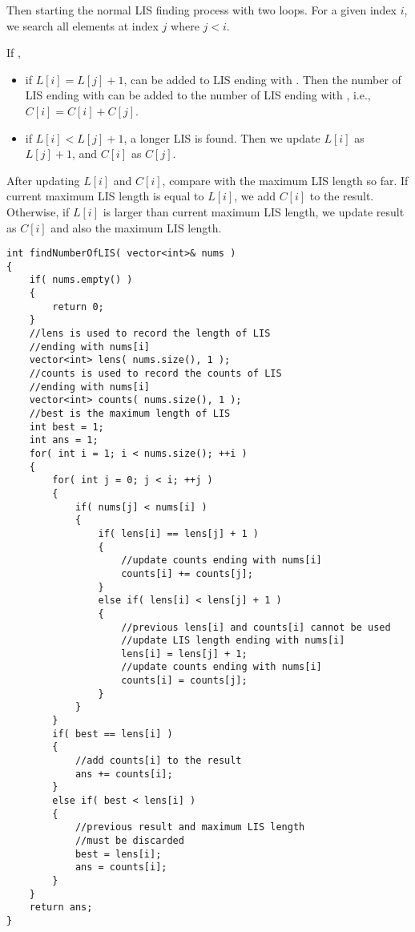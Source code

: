 Then starting the normal LIS finding process with two loops.
For a given index $i$, we search all elements at index $j$ where $j <i$. 

If , 
\begin{itemize}
\item if $L[i]=L[j]+1$,  can be added to LIS ending with . Then the number of LIS ending with  can be added to the number of LIS ending with , i.e., $C[i] = C[i] + C[j]$.
\item if $L[i] < L[j]+1$, a longer LIS is found. Then we update $L[i]$ as $L[j]+1$, and $C[i]$ as $C[j]$. 
\end{itemize}

After updating $L[i]$ and $C[i]$, compare with the maximum LIS length so far. If current maximum LIS length is equal to $L[i]$, we add $C[i]$ to the result. Otherwise, if $L[i]$ is larger than current maximum LIS length, we update result as $C[i]$ and also the maximum LIS length.

\setcounter{lstlisting}{0}
\begin{lstlisting}[style=customc, caption={DP}]
int findNumberOfLIS( vector<int>& nums )
{
    if( nums.empty() )
    {
        return 0;
    }
    //lens is used to record the length of LIS
    //ending with nums[i]
    vector<int> lens( nums.size(), 1 );
    //counts is used to record the counts of LIS
    //ending with nums[i]
    vector<int> counts( nums.size(), 1 );
    //best is the maximum length of LIS
    int best = 1;
    int ans = 1;
    for( int i = 1; i < nums.size(); ++i )
    {
        for( int j = 0; j < i; ++j )
        {
            if( nums[j] < nums[i] )
            {
                if( lens[i] == lens[j] + 1 )
                {
                    //update counts ending with nums[i]
                    counts[i] += counts[j];
                }
                else if( lens[i] < lens[j] + 1 )
                {
                    //previous lens[i] and counts[i] cannot be used
                    //update LIS length ending with nums[i]
                    lens[i] = lens[j] + 1;
                    //update counts ending with nums[i]
                    counts[i] = counts[j];
                }
            }
        }
        if( best == lens[i] )
        {
            //add counts[i] to the result
            ans += counts[i];
        }
        else if( best < lens[i] )
        {
            //previous result and maximum LIS length
            //must be discarded
            best = lens[i];
            ans = counts[i];
        }
    }
    return ans;
}
\end{lstlisting}